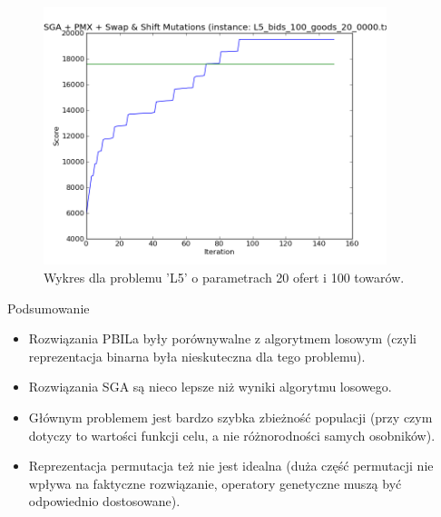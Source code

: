 \begin{frame}
    \begin{figure}
        \centering
        \includegraphics[width=10cm]{wykresy/L5_bids_100_goods_20_0000_txt_1.png}
        \caption{Wykres dla problemu 'L5' o parametrach 20 ofert i 100 towarów.}
    \end{figure}
\end{frame}

\begin{frame}{Podsumowanie}
\begin{itemize}
\item Rozwiązania PBILa były porównywalne z algorytmem losowym (czyli reprezentacja binarna była nieskuteczna dla tego problemu).
\item Rozwiązania SGA są nieco lepsze niż wyniki algorytmu losowego.
\item Głównym problemem jest bardzo szybka zbieżność populacji (przy czym dotyczy to wartości funkcji celu, a nie różnorodności samych osobników).
\item Reprezentacja permutacja też nie jest idealna (duża część permutacji nie wpływa na faktyczne rozwiązanie, operatory genetyczne muszą być odpowiednio dostosowane).
\end{itemize}
\end{frame}
